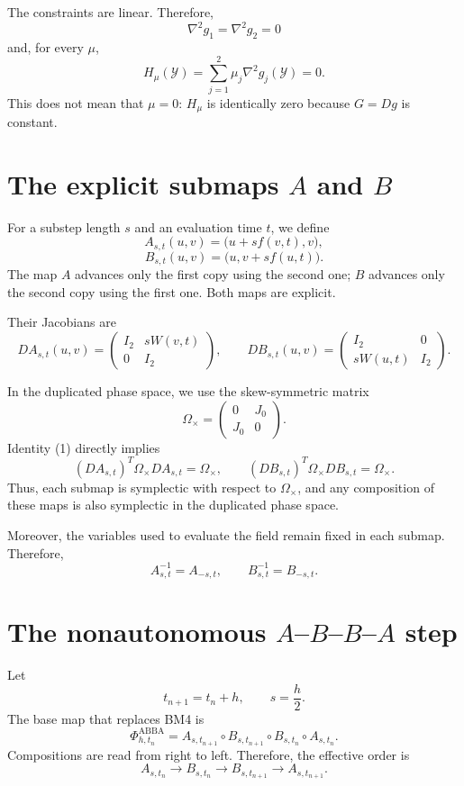 \documentclass[11pt,a4paper]{article}
\newcommand{\Id}{I}
\newcommand{\Y}{\mathcal{Y}}
\newcommand{\Om}{\Omega_{\times}}
\newcommand{\PhiAB}{\Phi^{\mathrm{ABBA}}_{h,t_n}}
\begin{document}
The constraints are linear. Therefore,
\[
 \nabla^2g_1=\nabla^2g_2=0
\]
and, for every $\mu$,
\[
 \boxed{
 H_\mu(\Y)=\sum_{j=1}^2\mu_j\nabla^2g_j(\Y)=0.
 }
\]
This does not mean that $\mu=0$: $H_\mu$ is identically zero because $G=Dg$ is constant.

\section{The explicit submaps \texorpdfstring{$A$}{A} and \texorpdfstring{$B$}{B}}

For a substep length $s$ and an evaluation time $t$, we define
\[
 A_{s,t}(u,v)=\bigl(u+s f(v,t),v\bigr), \tag{2}
\]
\[
 B_{s,t}(u,v)=\bigl(u,v+s f(u,t)\bigr). \tag{3}
\]
The map $A$ advances only the first copy using the second one; $B$ advances only the
second copy using the first one. Both maps are explicit.

Their Jacobians are
\[
 DA_{s,t}(u,v)=
 \begin{pmatrix}
  \Id_2&sW(v,t)\\
  0&\Id_2
 \end{pmatrix},
 \qquad
 DB_{s,t}(u,v)=
 \begin{pmatrix}
  \Id_2&0\\
  sW(u,t)&\Id_2
 \end{pmatrix}. \tag{4}
\]

In the duplicated phase space, we use the skew-symmetric matrix
\[
 \Om=
 \begin{pmatrix}
  0&J_0\\
  J_0&0
 \end{pmatrix}.
\]
Identity (1) directly implies
\[
 (DA_{s,t})^T\Om DA_{s,t}=\Om,
 \qquad
 (DB_{s,t})^T\Om DB_{s,t}=\Om.
\]
Thus, each submap is symplectic with respect to $\Om$, and any composition of these maps is
also symplectic in the duplicated phase space.

Moreover, the variables used to evaluate the field remain fixed in each submap. Therefore,
\[
 \boxed{A_{s,t}^{-1}=A_{-s,t},\qquad B_{s,t}^{-1}=B_{-s,t}.} \tag{5}
\]

\section{The nonautonomous \texorpdfstring{$A$--$B$--$B$--$A$}{A-B-B-A} step}

Let
\[
 t_{n+1}=t_n+h,
 \qquad
 s=\frac h2.
\]
The base map that replaces BM4 is
\[
 \boxed{
 \PhiAB
 =A_{s,t_{n+1}}
  \circ B_{s,t_{n+1}}
  \circ B_{s,t_n}
  \circ A_{s,t_n}.
 } \tag{6}
\]
Compositions are read from right to left. Therefore, the effective order is
\[
 A_{s,t_n}\longrightarrow B_{s,t_n}
 \longrightarrow B_{s,t_{n+1}}\longrightarrow A_{s,t_{n+1}}.
\]
\end{document}
